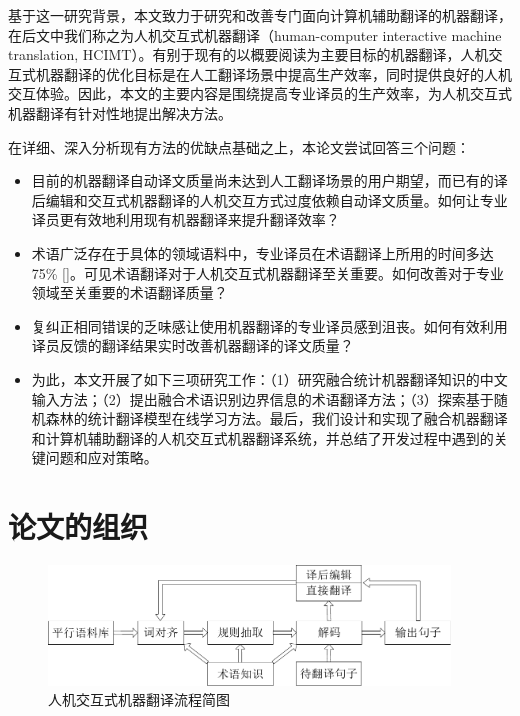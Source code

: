 基于这一研究背景，本文致力于研究和改善专门面向计算机辅助翻译的机器翻译，在后文中我们称之为人机交互式机器翻译（human-computer interactive machine translation, HCIMT）。有别于现有的以概要阅读为主要目标的机器翻译，人机交互式机器翻译的优化目标是在人工翻译场景中提高生产效率，同时提供良好的人机交互体验。因此，本文的主要内容是围绕提高专业译员的生产效率，为人机交互式机器翻译有针对性地提出解决方法。

在详细、深入分析现有方法的优缺点基础之上，本论文尝试回答三个问题：

\begin{itemize}
	\item 目前的机器翻译自动译文质量尚未达到人工翻译场景的用户期望，而已有的译后编辑和交互式机器翻译的人机交互方式过度依赖自动译文质量。如何让专业译员更有效地利用现有机器翻译来提升翻译效率？
	
	\item 术语广泛存在于具体的领域语料中，专业译员在术语翻译上所用的时间多达75\% [\cite{Austermuhl:2014}]。可见术语翻译对于人机交互式机器翻译至关重要。如何改善对于专业领域至关重要的术语翻译质量？
	
	\item 复纠正相同错误的乏味感让使用机器翻译的专业译员感到沮丧。如何有效利用译员反馈的翻译结果实时改善机器翻译的译文质量？
	
	\item 为此，本文开展了如下三项研究工作：（1）研究融合统计机器翻译知识的中文输入方法；（2）提出融合术语识别边界信息的术语翻译方法；（3）探索基于随机森林的统计翻译模型在线学习方法。最后，我们设计和实现了融合机器翻译和计算机辅助翻译的人机交互式机器翻译系统，并总结了开发过程中遇到的关键问题和应对策略。
\end{itemize}

\section{论文的组织}

\begin{figure}[!htbp]
	\centering
	\includegraphics[width=0.95\textwidth]{Figure/Figure_1_1.pdf}
	\caption{人机交互式机器翻译流程简图}
	\label{Fig_imt_procedure}
\end{figure}

